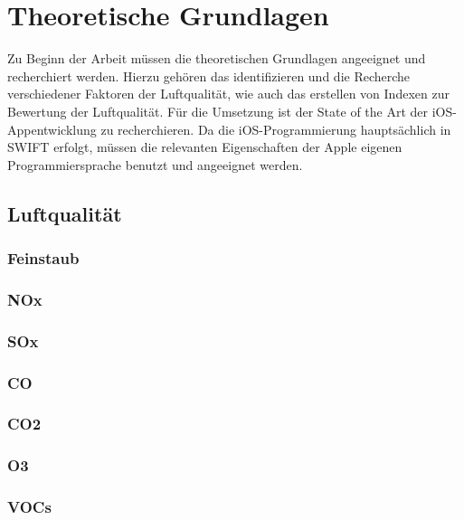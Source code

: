 
\chapter{Theoretische Grundlagen}\label{cha:Grundlagen}
Zu Beginn der Arbeit müssen die theoretischen Grundlagen angeeignet und recherchiert werden. Hierzu gehören das identifizieren und die Recherche verschiedener Faktoren der Luftqualität, wie auch das erstellen von Indexen zur Bewertung der Luftqualität. Für die Umsetzung ist der State of the Art der iOS-Appentwicklung zu recherchieren. Da die iOS-Programmierung hauptsächlich in SWIFT erfolgt, müssen die relevanten Eigenschaften der Apple eigenen Programmiersprache benutzt und angeeignet werden.

\section{Luftqualität}\label{sec:Luftqualität}

\subsection{Feinstaub}\label{subsec:Feinstaub}

\subsection{\acf{NOx}}\label{subsec:NOx}

\subsection{\acf{SOx}}\label{subsec:SOx}

\subsection{\acf{CO}}\label{subsec:CO}

\subsection{\acf{CO2}}\label{subsec:CO2}

\subsection{\acf{O3}}\label{subsec:O3}
	
\subsection{\acf{VOCs}}\label{subsec:VOCs}

